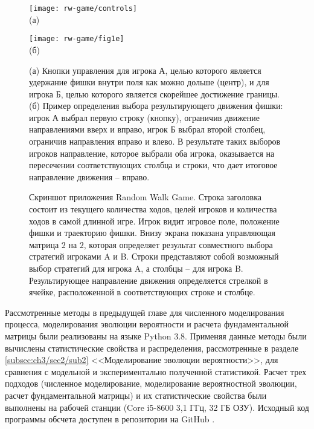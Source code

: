 \begin{figure}[ht]
    \begin{minipage}[b][][b]{0.49\linewidth}\centering
        \texttt{[image: rw-game/controls]} \\ (а)
    \end{minipage}
    \hfill
    \begin{minipage}[b][][b]{0.49\linewidth}\centering
        \texttt{[image: rw-game/fig1e]} \\ (б)
    \end{minipage}
    \caption{
        (а) Кнопки управления для игрока А, целью которого является удержание фишки внутри поля как можно дольше (центр), и для игрока Б, целью которого является скорейшее достижение границы. (б) Пример определения выбора результирующего движения фишки: игрок А выбрал первую строку (кнопку), ограничив движение направлениями вверх и вправо, игрок Б выбрал второй столбец, ограничив направления вправо и влево. В результате таких выборов игроков направление, которое выбрали оба игрока, оказывается на пересечении соответствующих столбца и строки, что дает итоговое направление движения -- вправо.
    }
    \label{fig:controls}
\end{figure}


\begin{figure}[ht]
    \caption{
        Скриншот приложения Random Walk Game. Строка заголовка состоит из текущего количества ходов, целей игроков и количества ходов в самой длинной игре. Игрок видит игровое поле, положение фишки и траекторию фишки. Внизу экрана показана управляющая матрица $2$ на $2$, которая определяет результат совместного выбора стратегий игроками A и B. Строки представляют собой возможный выбор стратегий для игрока A, а столбцы -- для игрока B. Результирующее направление движения определяется стрелкой в ячейке, расположенной в соответствующих строке и столбце.
    }\label{fig:screenshot_game_field}
\end{figure}


Рассмотренные методы в предыдущей главе для численного моделирования процесса, моделирования эволюции вероятности и расчета фундаментальной матрицы были реализованы на языке Python 3.8. Применяя данные методы были вычислены статистические свойства и распределения, рассмотренные в разделе \cref{subsec:ch3/sec2/sub2} <<Моделирование эволюции вероятности>>, для сравнения с модельной и экспериментально полученной статистикой. Расчет трех подходов (численное моделирование, моделирование вероятностной эволюции, расчет фундаментальной матрицы) и их статистические свойства были выполнены на рабочей станции (Core i5-8600 3,1 ГГц, 32 ГБ ОЗУ). Исходный код программы обсчета доступен в репозитории на GitHub \cite{RWAnalyzer}.

